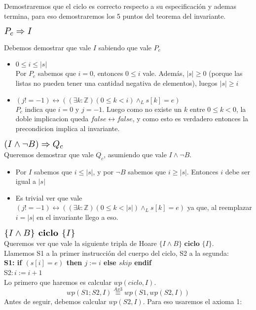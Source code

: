 \documentclass[a4paper]{article}
\begin{document}
Demostraremos que el ciclo es correcto respecto a su especificación y ademas termina, para eso demostraremos los 5 puntos del 
teorema del invariante.
	\begin{flushleft}$\scalebox{1.3}{$P_c\Rightarrow I$}$\end{flushleft}
	Debemos demostrar que vale $I$ sabiendo que vale $P_c$ 
	\begin{itemize}
		\item $ 0\leq i\leq |s|$\smallskip \\
		Por $P_c$ sabemos que $i=0$, entonces $0\leq i $ vale. Además, $|s|\geq 0$ (porque las listas no pueden tener una cantidad 
		negativa de elementos), luegos $|s|\geq i$
		\item $ (j!=-1)\leftrightarrow ((\exists k:\mathbb{Z})(0\leq k<i)\wedge_L s[k]=e)$\smallskip \\
		$P_c$ indica que $i=0$ y $j=-1$. Luego como no existe un $k$ entre $0\leq k <0$, la doble implicacion queda $false\leftrightarrow false$, y como esto es verdadero entonces la precondicion implica al invariante.
	\end{itemize}	 
	$\scalebox{1.3}{$(I\wedge \neg B)\Rightarrow Q_c$}$\smallskip \\
	Queremos demostrar que vale $Q_c$, asumiendo que vale  $I\wedge \neg B$.
	\begin{itemize}
	\item Por $I$ sabemos que $i\leq |s|$, y por $\neg B$ sabemos que $i\geq |s|$. Entonces $i$ debe ser igual a $|s|$
	\item Es trivial ver que vale $ (j!=-1)\leftrightarrow ((\exists k:\mathbb{Z})(0\leq k<|s|)\wedge_L s[k]=e)$ ya que, al reemplazar
	 $i=|s|$ en el invariante llego a eso.
	\end{itemize}
	$\scalebox{1.3}{$\{I\wedge B\} \textbf{ ciclo } \{I\}$}$\medskip \\
	Queremos ver que vale la siguiente tripla de Hoare $\{I\wedge B\} \textbf{ ciclo } \{I\}$.\\
	Llamemos S1 a la primer instrucción del cuerpo del ciclo, S2 a la segunda:\\
	\textbf{S1: if $(s[i]=e)$ then $j:=i$ else $skip$ endif}\\
	S2$: i:=i+1$\\
	Lo primero que haremos es calcular $wp(ciclo,I)$.
	\begin{equation}wp(S1;S2,I)\stackrel{Ax3}{\equiv}wp(S1,wp(S2,I))\end{equation}
	Antes de seguir, debemos calcular $wp(S2,I)$. Para eso usaremos el axioma 1:
\end{document}
